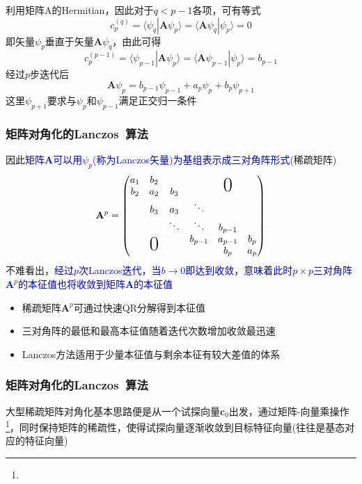 {{	利用矩阵$\mathrm{A}$的\textrm{Hermitian}，因此对于$q<p-1$各项，可有等式
	\begin{displaymath}
		c_p^{(q)}=\langle\psi_q|\mathbf{A}\psi_p\rangle=\langle\mathbf{A}\psi_q|\psi_p\rangle=0
	\end{displaymath}
	即矢量$\psi_p$垂直于矢量$\mathbf{A}\psi_q$，由此可得
	\begin{displaymath}
		c_p^{(p-1)}=\langle\psi_{p-1}|\mathbf{A}\psi_p\rangle=\langle\mathbf{A}\psi_{p-1}|\psi_p\rangle=b_{p-1}
	\end{displaymath}
	经过$p$步迭代后
	\begin{displaymath}
		\mathbf{A}\psi_p=b_{p-1}\psi_{p-1}+a_p\psi_p+b_p\psi_{p+1}
	\end{displaymath}
	这里$\psi_{p+1}$要求与$\psi_p$和$\psi_{p-1}$满足正交归一条件
}

\frame
{
	\frametitle{矩阵对角化的\textrm{Lanczos~}算法}
	因此\textcolor{blue}{矩阵$\mathbf{A}$可以用$\psi_p$(称为\textrm{Lanczos}矢量)为基组表示成三对角阵形式}(稀疏矩阵)
	\begin{displaymath}
		\mathbf{A}^p=\begin{pmatrix}
			a_1 & b_2 & & & & \\
			b_2 & a_2 &b_3 & &\raisebox{0.8ex}[0pt]{\huge{0}} &\\
&b_3 &a_3 &\ddots & & \\
& &\ddots &\ddots &b_{p-1} & \\
& & &b_{p-1} &a_{p-1} &b_{p}\\
&\raisebox{0.8ex}[0pt]{\huge{0}} & & &b_{p} &a_{p}
		\end{pmatrix}
	\end{displaymath}
	不难看出，\textcolor{blue}{经过$p$次\textrm{Lanczos}迭代，当$b\rightarrow0$即达到收敛，意味着此时$p\times p$三对角阵$\mathbf{A}^p$的本征值也将收敛到矩阵$\mathbf{A}$的本征值}
	\begin{itemize}
		\item 稀疏矩阵$\mathbf{A}^p$可通过快速\textrm{QR}分解得到本征值
		\item 三对角阵的最低和最高本征值随着迭代次数增加收敛最迅速
		\item \textrm{Lanczos}方法适用于少量本征值与剩余本征有较大差值的体系
	\end{itemize}
}

\frame
{
	\frametitle{矩阵对角化的\textrm{Lanczos~}算法}
	大型稀疏矩阵对角化基本思路便是从一个试探向量$\mathbf{c}_0$出发，通过矩阵-向量乘操作\footnote{\fontsize{5.2pt}{1.2pt}}，同时保持矩阵的稀疏性，使得试探向量逐渐收敛到目标特征向量(往往是基态对应的特征向量)

}}
